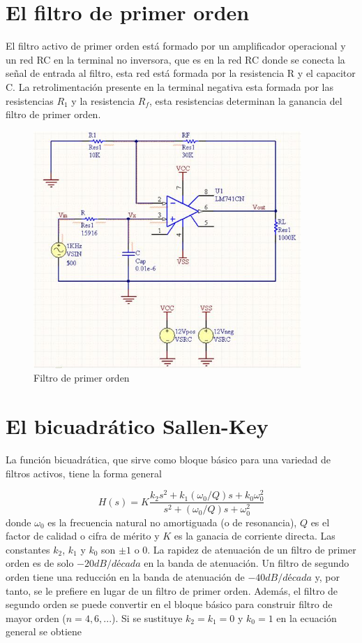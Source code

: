 \documentclass[12pt]{book}
\theoremstyle{definition}
\theoremstyle{remark}
\theoremstyle{plain}
\begin{document}
\section{El filtro de primer orden}

El filtro activo de primer orden está formado por un amplificador operacional y un red RC en la terminal no inversora, que es en la red RC donde se conecta la señal de entrada al filtro, esta red está formada por la resistencia R y el capacitor C. La retrolimentación presente en la terminal negativa esta formada por las resistencias $R_1$ y la resistencia $R_f$, esta resistencias determinan la ganancia del filtro de primer orden.


\begin{figure}
\centering
\includegraphics[width=4in]{FiltroPrimerOrdenpasabajas.jpg}
\caption{Filtro de primer orden}
\label{fig9}
\end{figure}

\section{El bicuadrático Sallen-Key}
La función bicuadrática, que sirve como bloque básico para una variedad de filtros activos, tiene la forma general 

\begin{equation}
H(s)=K \frac{k_2 s^2+k_1 (\omega_0/Q) s + k_0 \omega _0^2}{s^2+(\omega_0/Q) s+\omega_0^2}
\label{equ100}
\end{equation}
donde $\omega_0$ es la frecuencia natural no amortiguada (o de resonancia), $Q$ es el factor de calidad o cifra de mérito y $K$ es la ganacia de corriente directa. Las constantes $k_2$, $k_1$ y $k_0$ son $\pm 1$ o $0$. 
La rapidez de atenuación de un filtro de primer orden es de solo $-20 dB/década$ en la banda de atenuación. Un filtro de segundo orden tiene una reducción en la banda de atenuación de $-40 dB/década$ y, por tanto, se le prefiere en lugar de un filtro de primer orden. Además, el filtro de segundo orden se puede convertir en el bloque básico para construir filtro de mayor orden ($n=4,6,...$). Si se sustituye $k_2=k_1=0$ y $k_0=1$ en la ecuación general se obtiene
\end{document}
